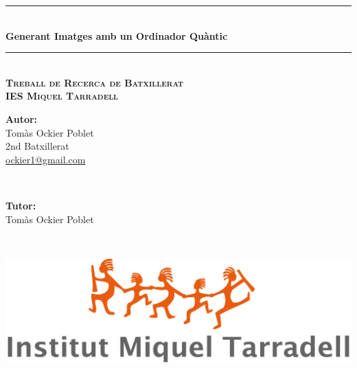 \documentclass[a4paper,12pt,arial,numbered,print,index,oneside]{book}
\newcommand{\HRule}{\rule{\linewidth}{0.5mm}} %
\begin{document}
	\begin{titlepage}
		
		\center %
		

		
		\HRule \\[0.4cm]
		{ \Huge \bfseries Generant Imatges amb un Ordinador Quàntic}\\[0.1cm] 
		\HRule \\[1.5cm]
		
		\textsc{\Large \textbf{Treball de Recerca de Batxillerat}}\\[.3cm]
		
		\textsc{\large \textbf{IES Miquel Tarradell}}\\[2cm]
		
		
		\vspace{8.3cm}
		\begin{minipage}{0.48\textwidth}
			\begin{flushleft} \large
				\Large \textbf{Autor:}\\[0.1cm]
				\Large Tomàs Ockier Poblet \\ 2nd Batxillerat \\ \href{mailto:ockier1@gmail.com}{ockier1@gmail.com}
			\end{flushleft}
		\end{minipage}
		~
		\begin{minipage}{0.48\textwidth}
			\begin{flushright} \large
				\Large \textbf{Tutor:} \\[0.1cm]
				\Large Tomàs Ockier Poblet 
			\end{flushright}
		\end{minipage}\\[1.5cm]
		
		
		\begin{minipage}{0.85\textwidth}
			\begin{center}
								\includegraphics[scale=0.2]{Figures/Cover/logo-tarradell.jpg}
			\end{center}
		\end{minipage}
		

\end{titlepage}
\end{document}
